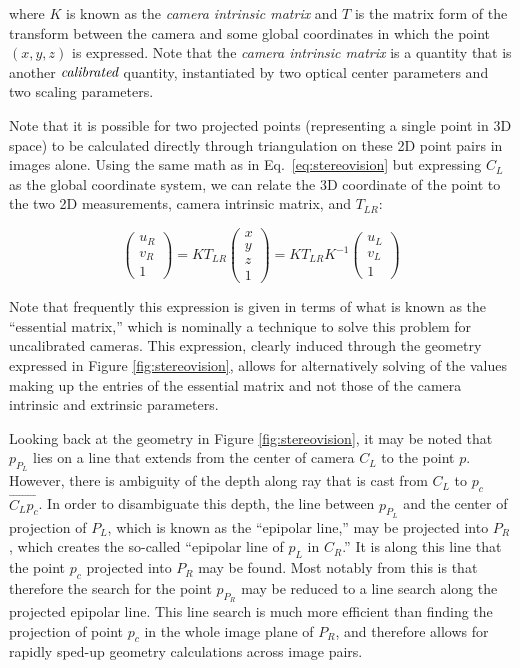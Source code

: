 \noindent where $K$ is known as the \emph{camera intrinsic matrix} and $T$ is the matrix form of the transform between the camera and some global coordinates in which the point $(x, y, z)$ is expressed. Note that the \emph{camera intrinsic matrix} is a quantity that is another $\emph{calibrated}$ quantity, instantiated by two optical center parameters and two scaling parameters.

Note that it is possible for two projected points (representing a single point in 3D space) to be calculated directly through triangulation on these 2D point pairs in images alone. Using the same math as in Eq.\ \eqref{eq:stereovision} but expressing $C_L$ as the global coordinate system, we can relate the 3D coordinate of the point to the two 2D measurements, camera intrinsic matrix, and $T_{LR}$:

\begin{equation}
\begin{pmatrix}
u_R\\
v_R\\
1
\end{pmatrix}
= K T_{LR} \begin{pmatrix} x \\ y \\ z \\ 1\end{pmatrix}
= K T_{LR} K^{-1} \begin{pmatrix} u_L \\ v_L \\ 1 \end{pmatrix}
\end{equation}

Note that frequently this expression is given in terms of what is known as the ``essential matrix,'' which is nominally a technique to solve this problem for uncalibrated cameras. This expression, clearly induced through the geometry expressed in Figure \ref{fig:stereovision}, allows for alternatively solving of the values making up the entries of the essential matrix and not those of the camera intrinsic and extrinsic parameters.

Looking back at the geometry in Figure \ref{fig:stereovision}, it may be noted that $p_{P_L}$ lies on a line that extends from the center of camera $C_L$ to the point $p$. However, there is ambiguity of the depth along ray that is cast from $C_L$ to $p_c$ $\overrightarrow{C_L p_c}$. In order to disambiguate this depth, the line between $p_{P_L}$ and the center of projection of $P_L$, which is known as the ``epipolar line,''  may be projected into $P_R$, which creates the so-called ``epipolar line of $p_L$ in $C_R$.'' It is along this line that the point $p_c$ projected into $P_R$ may be found. Most notably from this is that therefore the search for the point $p_{P_R}$ may be reduced to a line search along the projected epipolar line. This line search is much more efficient than finding the projection of point $p_c$ in the whole image plane of $P_R$, and therefore allows for rapidly sped-up geometry calculations across image pairs.

